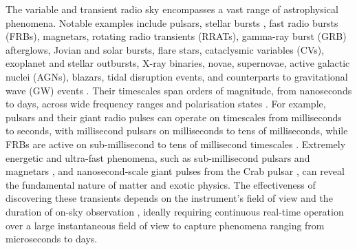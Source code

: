 \documentclass[
  journal=pasa,
  manuscript=article-type,
  year=2020,
  volume=37,
]{cup-journal}
\begin{document}
The variable and transient radio sky encompasses a vast range of astrophysical phenomena. Notable examples include pulsars, stellar bursts \citep{Zhang+2023}, fast radio bursts (FRBs), magnetars, rotating radio transients (RRATs), gamma-ray burst (GRB) afterglows, Jovian and solar bursts, flare stars, cataclysmic variables (CVs), exoplanet and stellar outbursts, X-ray binaries, novae, supernovae, active galactic nuclei (AGNs), blazars, tidal disruption events, and counterparts to gravitational wave (GW) events \citep{Lorimer+2007,Thyagarajan+2011,Keane2013,Thornton+2013,Bochenek+2020}. Their timescales span orders of magnitude, from nanoseconds to days, across wide frequency ranges and polarisation states \citep[][and references therein]{Pietka+2015,Chandra+2016,Nimmo+2022}. For example, pulsars and their giant radio pulses can operate on timescales from milliseconds to seconds, with millisecond pulsars on milliseconds to tens of milliseconds, while FRBs are active on sub-millisecond to tens of millisecond timescales \citep{Crawford+2022,Gupta+2022,Snelders+2023}. Extremely energetic and ultra-fast phenomena, such as sub-millisecond pulsars and magnetars \citep{Du+2009,Haskell+2018}, and nanosecond-scale giant pulses from the Crab pulsar \citep{Hankins+2003,Hankins+2007,Eilek+2016,Philippov+2019}, can reveal the fundamental nature of matter and exotic physics. The effectiveness of discovering these transients depends on the instrument's field of view and the duration of on-sky observation \citep{Cordes2007}, ideally requiring continuous real-time operation over a large instantaneous field of view to capture phenomena ranging from microseconds to days.

\end{document}
